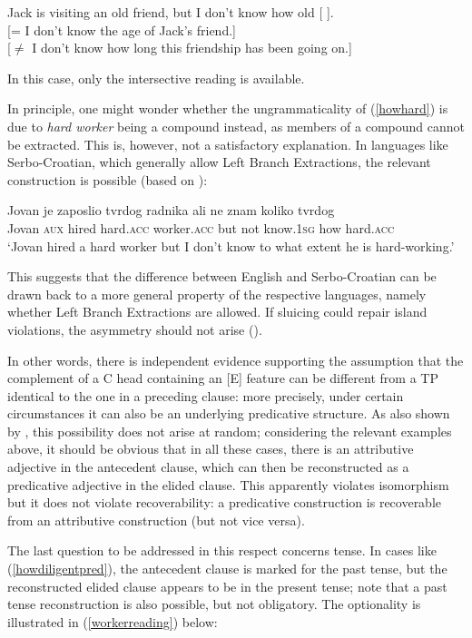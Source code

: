 \ea Jack is visiting an old friend, but I don't know how old [ ].\\
{[}= I don't know the age of Jack's friend.]\\
{[}$\neq$ I don't know how long this friendship has been going on.]
\z

In this case, only the intersective reading is available.

In principle, one might wonder whether the ungrammaticality of (\ref{howhard}) is due to \textit{hard worker} being a compound instead, as members of a compound cannot be extracted. This is, however, not a satisfactory explanation. In languages like Serbo-Croatian, which generally allow Left Branch Extractions, the relevant construction is possible (based on \citealt[486, ex. 16]{vicente2018}):

\ea \gll Jovan je zaposlio tvrdog radnika ali ne znam koliko tvrdog\\
Jovan \textsc{aux} hired hard.\textsc{acc} worker.\textsc{acc} but not know.\textsc{1sg} how hard.\textsc{acc}\\
\glt `Jovan hired a hard worker but I don't know to what extent he is hard-working.'
\z

This suggests that the difference between English and Serbo-Croatian can be drawn back to a more general property of the respective languages, namely whether Left Branch Extractions are allowed. If sluicing could repair island violations, the asymmetry should not arise (\citealt[486]{vicente2018}).

In other words, there is independent evidence supporting the assumption that the complement of a C head containing an [E] feature can be different from a TP identical to the one in a preceding clause: more precisely, under certain circumstances it can also be an underlying predicative structure. As also shown by \citet{vicente2018}, this possibility does not arise at random; considering the relevant examples above, it should be obvious that in all these cases, there is an attributive adjective in the antecedent clause, which can then be reconstructed as a predicative adjective in the elided clause. This apparently violates isomorphism but it does not violate recoverability: a predicative construction is recoverable from an attributive construction (but not vice versa).

The last question to be addressed in this respect concerns tense. In cases like (\ref{howdiligentpred}), the antecedent clause is marked for the past tense, but the reconstructed elided clause appears to be in the present tense; note that a past tense reconstruction is also possible, but not obligatory. The optionality is illustrated in (\ref{workerreading}) below:

